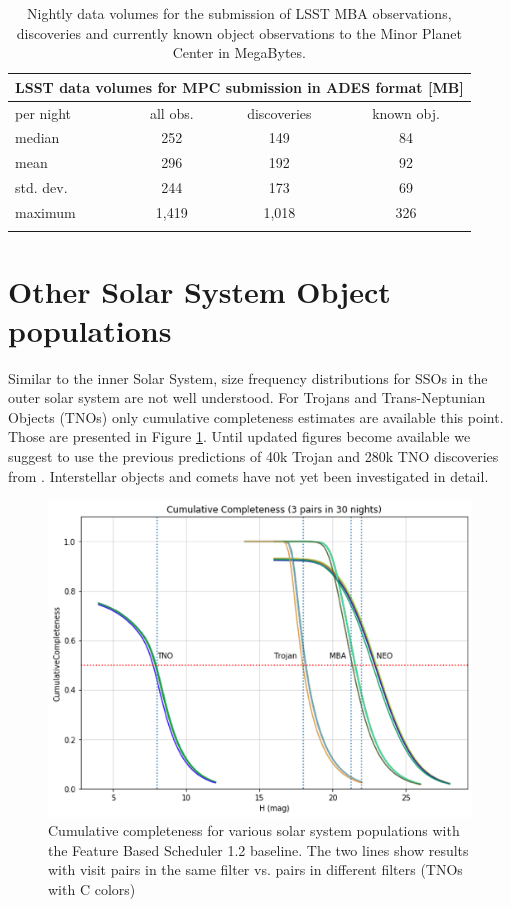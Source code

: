 \begin{table}[tb!]
\begin{center}
\begin{tabular}{lccc}
\multicolumn{4}{c}{LSST data volumes for \gls{MPC} submission in \gls{ADES} format [MB]}\\
\hline\hline
per night & all obs. & discoveries & known obj. \\\hline
median  & 252 &149  &84  \\
mean & 296 & 192 & 92   \\
std. dev. & 244 & 173& 69 \\
maximum & 1,419 & 1,018 & 326 \\
\hline\hline\\
\end{tabular}
\end{center}
\caption{Nightly data volumes for the submission of \gls{LSST} MBA observations, discoveries and currently known object observations to the Minor Planet \gls{Center} in MegaBytes.}
\label{tab:data_stats}
\end{table}

\section{Other Solar System \gls{Object} populations}\label{sec:other}
Similar to the inner Solar System, size frequency distributions for SSOs in the outer solar system are not well understood. 
For Trojans and Trans-Neptunian Objects (TNOs) only cumulative completeness estimates are available this point. Those are presented in Figure \ref{fig:allcum}.
Until updated figures become available we suggest to use the previous predictions of 40k Trojan and 280k \gls{TNO} discoveries from \citet{jones2015asteroid}.
Interstellar objects and comets have not yet been investigated in detail.

\begin{figure}[tb!]
\begin{center}
\includegraphics[width=0.60\linewidth]{figs/allcum.png}
\end{center}
\caption{Cumulative completeness for various solar system populations with the Feature Based Scheduler 1.2 baseline.
The two lines show results with visit pairs in the same filter vs. pairs in different filters (TNOs with C colors)}
\label{fig:allcum}       %
\end{figure}


